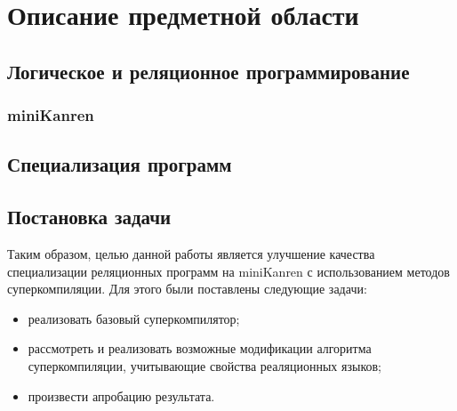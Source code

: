 \section{Описание предметной области}

\subsection{Логическое и реляционное программирование}





\subsubsection{miniKanren}



\subsection{Специализация программ}



\subsection{Постановка задачи}

Таким образом, целью данной работы является улучшение качества специализации
реляционных программ на miniKanren с использованием методов суперкомпиляции.
Для этого были поставлены следующие задачи:
\begin{itemize}
\item реализовать базовый суперкомпилятор;
\item рассмотреть и реализовать возможные модификации алгоритма суперкомпиляции,
      учитывающие свойства реаляционных языков;
\item произвести апробацию результата.
\end{itemize}

